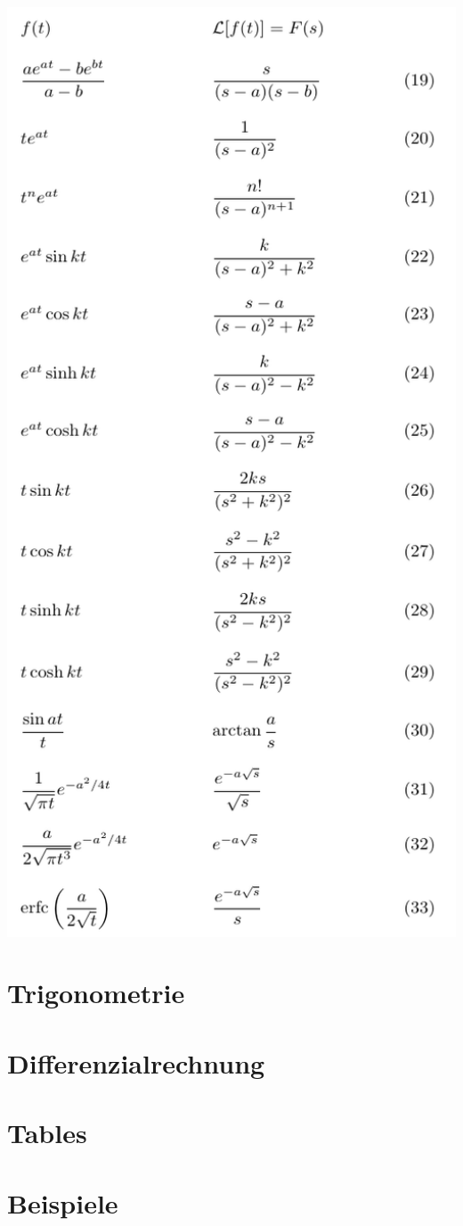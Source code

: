 \documentclass[11pt]{article}
\begin{document}
\includegraphics[width=1\textwidth]{images/img_koma/laplace_table2.png}


\part{Trigonometrie}
\setcounter{section}{0}

\part{Differenzialrechnung}
\setcounter{section}{0}


\part{Tables}
\setcounter{section}{1}

\part{Beispiele}
\setcounter{section}{1}

\end{document}
